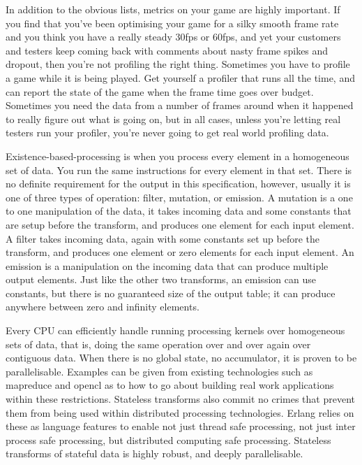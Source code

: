 In addition to the obvious lists, metrics on your game are highly important. If
you find that you've been optimising your game for a silky smooth frame rate
and you think you have a really steady 30fps or 60fps, and yet your customers
and testers keep coming back with comments about nasty frame spikes and
dropout, then you're not profiling the right thing. Sometimes you have to
profile a game while it is being played. Get yourself a profiler that runs all
the time, and can report the state of the game when the frame time goes over
budget. Sometimes you need the data from a number of frames around when it
happened to really figure out what is going on, but in all cases, unless you're
letting real testers run your profiler, you're never going to get real world
profiling data.

Existence-based-processing is when you process every element in a homogeneous
set of data. You run the same instructions for every element in that set.
There is no definite requirement for the output in this specification, however,
usually it is one of three types of operation: filter, mutation, or emission.
A mutation is a one to one manipulation of the data, it takes incoming data
and some constants that are setup before the transform, and produces one
element for each input element. A filter takes incoming data, again with some
constants set up before the transform, and produces one element or zero
elements for each input element. An emission is a manipulation on the incoming
data that can produce multiple output elements. Just like the other two
transforms, an emission can use constants, but there is no guaranteed size of
the output table; it can produce anywhere between zero and infinity elements.

Every CPU can efficiently handle running processing kernels over homogeneous
sets of data, that is, doing the same operation over and over again over
contiguous data. When there is no global state, no accumulator, it is proven to
be parallelisable. Examples can be given from existing technologies such as
mapreduce and opencl as to how to go about building real work applications
within these restrictions. Stateless transforms also commit no crimes that
prevent them from being used within distributed processing technologies. Erlang
relies on these as language features to enable not just thread safe processing,
not just inter process safe processing, but distributed computing safe
processing. Stateless transforms of stateful data is highly robust, and deeply
parallelisable.

